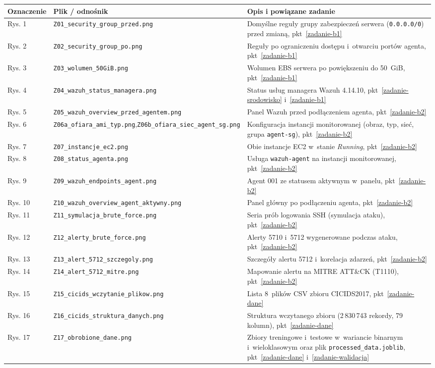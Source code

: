 \documentclass[11pt,a4paper,oneside]{article}
\begin{document}
\begin{tabularx}{\textwidth}{@{}p{} >{\footnotesize\raggedright\arraybackslash}p{} Y@{}}
\toprule
Oznaczenie & Plik / odnośnik & Opis i powiązane zadanie\\
\midrule
Rys. 1 & \texttt{Z01\_security\_group\_przed.png} & Domyślne reguły grupy zabezpieczeń serwera (\texttt{0.0.0.0/0}) przed zmianą, pkt~\ref{zadanie-b1}\\
Rys. 2 & \texttt{Z02\_security\_group\_po.png} & Reguły po ograniczeniu dostępu i~otwarciu portów agenta, pkt~\ref{zadanie-b1}\\
Rys. 3 & \texttt{Z03\_wolumen\_50GiB.png} & Wolumen EBS serwera po powiększeniu do 50~GiB, pkt~\ref{zadanie-b1}\\
Rys. 4 & \texttt{Z04\_wazuh\_status\_managera.png} & Status usług managera Wazuh 4.14.10, pkt~\ref{zadanie-srodowisko} i~\ref{zadanie-b1}\\
Rys. 5 & \texttt{Z05\_wazuh\_overview\_przed\_agentem.png} & Panel Wazuh przed podłączeniem agenta, pkt~\ref{zadanie-b2}\\
Rys. 6 & \texttt{Z06a\_ofiara\_ami\_typ.png},\newline \texttt{Z06b\_ofiara\_siec\_agent\_sg.png} & Konfiguracja instancji monitorowanej (obraz, typ, sieć, grupa \texttt{agent-sg}), pkt~\ref{zadanie-b2}\\
Rys. 7 & \texttt{Z07\_instancje\_ec2.png} & Obie instancje EC2 w~stanie \textit{Running}, pkt~\ref{zadanie-b2}\\
Rys. 8 & \texttt{Z08\_status\_agenta.png} & Usługa \texttt{wazuh-agent} na instancji monitorowanej, pkt~\ref{zadanie-b2}\\
Rys. 9 & \texttt{Z09\_wazuh\_endpoints\_agent.png} & Agent 001 ze statusem aktywnym w~panelu, pkt~\ref{zadanie-b2}\\
Rys. 10 & \texttt{Z10\_wazuh\_overview\_agent\_aktywny.png} & Panel główny po podłączeniu agenta, pkt~\ref{zadanie-b2}\\
Rys. 11 & \texttt{Z11\_symulacja\_brute\_force.png} & Seria prób logowania SSH (symulacja ataku), pkt~\ref{zadanie-b2}\\
Rys. 12 & \texttt{Z12\_alerty\_brute\_force.png} & Alerty 5710 i~5712 wygenerowane podczas ataku, pkt~\ref{zadanie-b2}\\
Rys. 13 & \texttt{Z13\_alert\_5712\_szczegoly.png} & Szczegóły alertu 5712 i~korelacja zdarzeń, pkt~\ref{zadanie-b2}\\
Rys. 14 & \texttt{Z14\_alert\_5712\_mitre.png} & Mapowanie alertu na MITRE ATT\&CK (T1110), pkt~\ref{zadanie-b2}\\
Rys. 15 & \texttt{Z15\_cicids\_wczytanie\_plikow.png} & Lista 8~plików CSV zbioru CICIDS2017, pkt~\ref{zadanie-dane}\\
Rys. 16 & \texttt{Z16\_cicids\_struktura\_danych.png} & Struktura wczytanego zbioru (2\,830\,743 rekordy, 79 kolumn), pkt~\ref{zadanie-dane}\\
Rys. 17 & \texttt{Z17\_obrobione\_dane.png} & Zbiory treningowe i~testowe w~wariancie binarnym i~wieloklasowym oraz plik \nolinkurl{processed_data.joblib}, pkt~\ref{zadanie-dane} i~\ref{zadanie-walidacja}\\
\bottomrule
\end{tabularx}
\end{document}
